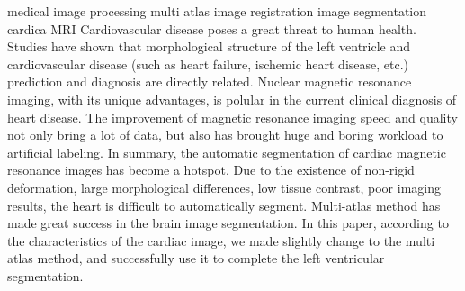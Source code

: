 
\begin{Eabstract}%
{medical image processing}%
{multi atlas}%
{image registration}%
{image segmentation}%
{cardica MRI}
  Cardiovascular disease poses a great threat to human health.
  Studies have shown that morphological structure of the left ventricle
  and cardiovascular disease
  (such as heart failure, ischemic heart disease, etc.)
  prediction and diagnosis are directly related.
  Nuclear magnetic resonance imaging,  with its unique advantages,
  is polular in the current clinical diagnosis of heart disease.
  The improvement of magnetic resonance imaging speed and quality
  not only bring a lot of data,
  but also has brought huge and boring workload to artificial labeling.
  In summary, 
  the automatic segmentation of cardiac magnetic resonance images
  has become a hotspot.
  Due to the existence of non-rigid deformation,
  large morphological differences,
  low tissue contrast,
  poor imaging results,
  the heart is difficult to automatically segment.
  Multi-atlas method has made great success in the brain image segmentation.
  In this paper, according to the characteristics of the cardiac image,
  we made slightly change to the multi atlas method,
  and successfully use it to complete the left ventricular segmentation.
\end{Eabstract}
